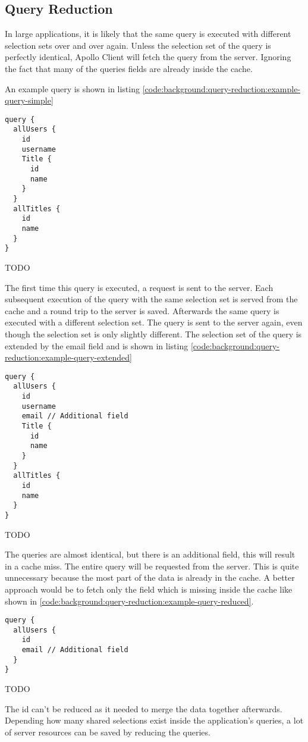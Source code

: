 \subsection{Query Reduction}

In large applications, it is likely that the same query is executed with different selection sets over and over again. Unless the selection set of the query is perfectly identical, Apollo Client will fetch the query from the server. Ignoring the fact that many of the queries fields are already inside the cache.

An example query is shown in listing \ref{code:background:query-reduction:example-query-simple}

\ifshowListings
\begin{listing}[H]
\begin{verbatim}
query {
  allUsers {
    id
    username
    Title {
      id
      name
    }
  }
  allTitles {
    id
    name
  }
}
\end{verbatim}
\caption{TODO}\label{code:background:query-reduction:example-query-simple}
\end{listing}
\fi

The first time this query is executed, a request is sent to the server. Each subsequent execution of the query with the same selection set is served from the cache and a round trip to the server is saved. Afterwards the same query is executed with a different selection set. The query is sent to the server again, even though the selection set is only slightly different. The selection set of the query is extended by the email field and is shown in listing \ref{code:background:query-reduction:example-query-extended}

\ifshowListings
\begin{listing}[H]
\begin{verbatim}
query {
  allUsers {
    id
    username
    email // Additional field
    Title {
      id
      name
    }
  }
  allTitles {
    id
    name
  }
}
\end{verbatim}
\caption{TODO}\label{code:background:query-reduction:example-query-extended}
\end{listing}
\fi

The queries are almost identical, but there is an additional field, this will result in a cache miss. The entire query will be requested from the server. This is quite unnecessary because the most part of the data is already in the cache. A better approach would be to fetch only the field which is missing inside the cache like shown in \ref{code:background:query-reduction:example-query-reduced}.

\ifshowListings
\begin{listing}[H]
\begin{verbatim}
query {
  allUsers {
    id
    email // Additional field
  }
}
\end{verbatim}
\caption{TODO}\label{code:background:query-reduction:example-query-reduced}
\end{listing}
\fi

The id can't be reduced as it needed to merge the data together afterwards. Depending how many shared selections exist inside the application's queries, a lot of server resources can be saved by reducing the queries. 